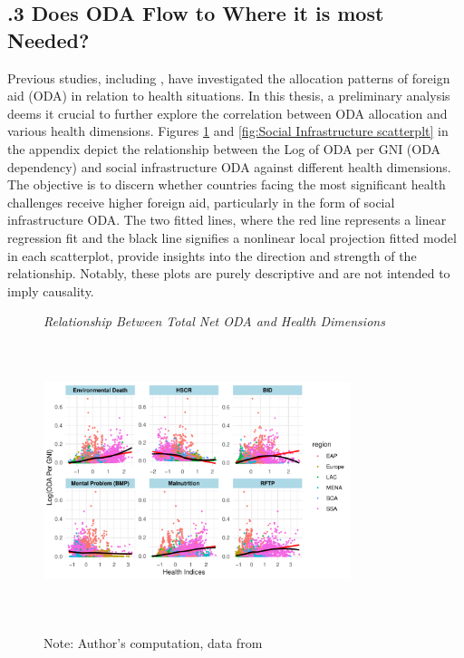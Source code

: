 \subsection*{.3 Does ODA Flow to Where it is most Needed?}
Previous studies, including \textcite{odokonyero_impact_2018, bavinger_relationship_2017, marty_taking_2017, temple_aid_2010}, have investigated the allocation patterns of foreign aid (ODA) in relation to health situations. In this thesis, a preliminary analysis deems it crucial to further explore the correlation between ODA allocation and various health dimensions. Figures \ref{fig:ODA against Hth dimension} and \ref{fig:Social Infrastructure scatterplt} in the appendix depict the relationship between the Log of ODA per GNI (ODA dependency) and social infrastructure ODA against different health dimensions. The objective is to discern whether countries facing the most significant health challenges receive higher foreign aid, particularly in the form of social infrastructure ODA. The two fitted lines, where the red line represents a linear regression fit and the black line signifies a nonlinear local projection fitted model in each scatterplot, provide insights into the direction and strength of the relationship. Notably, these plots are purely descriptive and are not intended to imply causality.

\begin{figure}[ht]
\captionsetup{justification=justified,singlelinecheck=false}
\caption{\textit{Relationship Between Total Net ODA and Health Dimensions}}
    \centering \includegraphics[width =  0.8\textwidth, height = 8cm]{Figures/ODA_against_Hth/ODA_Hth_plt.pdf}
    \label{fig:ODA against Hth dimension}
    \caption*{\footnotesize{Note: Author's computation, data from \textcite{unsdg_sustainable_2023, wdi_world_2023}}}
\end{figure}

